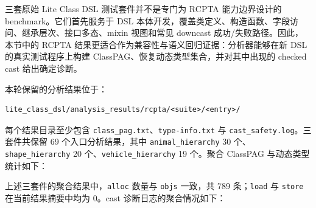 \documentclass[10.5pt,compsoc,UTF8]{cjc}
\theoremstyle{mystyle}
\begin{document}
三套原始 Lite Class DSL 测试套件并不是专门为 RCPTA 能力边界设计的 benchmark。它们首先服务于 DSL 本体开发，覆盖类定义、构造函数、字段访问、继承层次、接口多态、mixin 视图和常见 downcast 成功/失败路径。因此，本节中的 RCPTA 结果更适合作为兼容性与语义回归证据：分析器能够在新 DSL 的真实测试程序上构建 ClassPAG、恢复动态类型集合，并对其中出现的 checked cast 给出确定诊断。

本轮保留的分析结果位于：

\begin{lstlisting}
lite_class_dsl/analysis_results/rcpta/<suite>/<entry>/
\end{lstlisting}

每个结果目录至少包含 \texttt{class\_pag.txt}、\texttt{type-info.txt} 与 \texttt{cast\_safety.log}。三套件共保留 69 个入口分析结果，其中 \texttt{animal\_hierarchy} 30 个、\texttt{shape\_hierarchy} 20 个、\texttt{vehicle\_hierarchy} 19 个。聚合 ClassPAG 与动态类型统计如下：

\begin{table}[H]
\centering
\scriptsize
{}
\caption{Lite Class DSL 原始测试套件 RCPTA 聚合统计}
\label{tab:lite_original_suite_rcpta_stats}
\end{table}

上述三套件的聚合结果中，\texttt{alloc} 数量与 \texttt{objs} 一致，共 789 条；\texttt{load} 与 \texttt{store} 在当前结果摘要中均为 0。cast 诊断日志的聚合情况如下：

\begin{table}[H]
\centering
{}
\caption{Lite Class DSL 原始测试套件 cast 诊断日志统计}
\label{tab:lite_original_suite_cast_logs}
\end{table}
\end{document}
